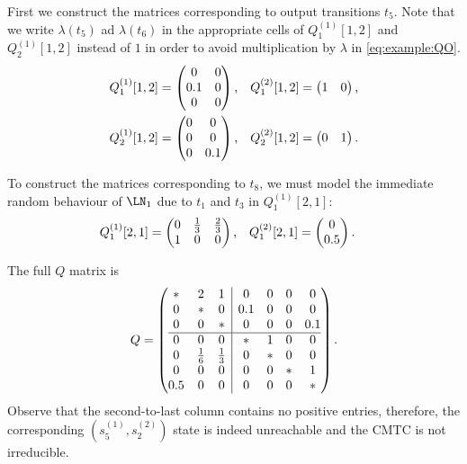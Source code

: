 First we construct the matrices corresponding to output transitions
$t_5$. Note that we write $\lambda(t_5)$ ad $\lambda(t_6)$ in the
appropriate cells of $Q^{(1)}_1[1, 2]$ and $Q^{(1)}_2[1, 2]$ instead
of $1$ in order to avoid multiplication by $\lambda$ in
\eqref{eq:example:QO}.
\begin{align}
  Q^{(1)}_1[1, 2] &= \begin{pmatrix}
    0 & 0 \\
    0.1 & 0 \\
    0 & 0
  \end{pmatrix} \text, &
  Q^{(2)}_1[1, 2] &= \begin{pmatrix}
    1 & 0
  \end{pmatrix} \text, \\
  Q^{(1)}_2[1, 2] &= \begin{pmatrix}
    0 & 0 \\
    0 & 0 \\
    0 & 0.1
  \end{pmatrix} \text, &
  Q^{(2)}_2[1, 2] &= \begin{pmatrix}
    0 & 1
  \end{pmatrix} \text. \\
\end{align}

To construct the matrices corresponding to $t_8$, we must model the
immediate random behaviour of $\LN_1$ due to $t_1$ and $t_3$ in
$Q^{(1)}_1[2, 1]$:
\begin{align}
  Q^{(1)}_1[2, 1] &= \begin{pmatrix}
    0 & \frac{1}{3} & \frac{2}{3} \\
    1 & 0 & 0
  \end{pmatrix} \text, &
  Q^{(2)}_1[2, 1] &= \begin{pmatrix}
    0 \\
    0.5
  \end{pmatrix} \text.
\end{align}

The full $Q$ matrix is
\begin{equation}
  Q = \left( \begin{array}{@{}ccc|cccc@{}}
               * & 2 & 1 & 0 & 0 & 0 & 0 \\
               0 & * & 0 & 0.1 & 0 & 0 & 0 \\
               0 & 0 & * & 0 & 0 & 0 & 0.1 \\
               \hline
               0 & 0 & 0 & * & 1 & 0 & 0 \\
               0 & \frac{1}{6} & \frac{1}{3} & 0 & * & 0 & 0 \\
               0 & 0 & 0 & 0 & 0 & * & 1 \\
               0.5 & 0 & 0 & 0 & 0 & 0 & * \\
             \end{array} \right) \text.
\end{equation}
Observe that the second-to-last column contains no positive entries,
therefore, the corresponding $(s^{(1)}_5, s^{(2)}_2)$ state is indeed
unreachable and the CMTC is not irreducible.

